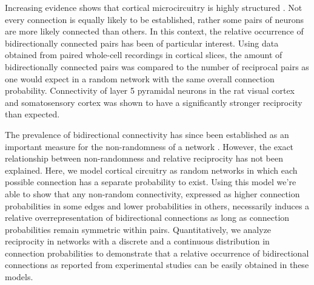 

Increasing evidence shows that cortical microcircuitry is highly structured \cite{Song2005,Perin2011}. Not every connection is equally likely to be established, rather some pairs of neurons are more likely connected than others. In this context, the relative occurrence of bidirectionally connected pairs has been of particular interest. Using data obtained from paired whole-cell recordings in cortical slices, the amount of bidirectionally connected pairs was compared to the number of reciprocal pairs as one would expect in a random network with the same overall connection probability. Connectivity of layer 5 pyramidal neurons in the rat visual cortex \cite{Song2005} and somatosensory cortex \cite{Markram1997, Perin2011} was shown to have a significantly stronger reciprocity than expected.



The prevalence of bidirectional connectivity has since been established as an important measure for the non-randomness of a network \cite{Lefort2009}. However, the exact relationship between non-randomness and relative reciprocity has not been explained. Here, we model cortical circuitry as random networks in which each possible connection has a separate probability to exist. Using this model we're able to show that any non-random connectivity, expressed as higher connection probabilities in some edges and lower probabilities in others, necessarily induces a relative overrepresentation of bidirectional connections as long as connection probabilities remain symmetric within pairs. Quantitatively, we analyze reciprocity in networks with a discrete and a continuous distribution in connection probabilities to demonstrate that a relative occurrence of bidirectional connections as reported from experimental studies can be easily obtained in these models.


